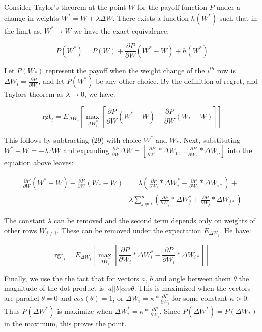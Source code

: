 \documentclass{article}
\begin{document}
Consider Taylor's theorem at the point $W$ for the payoff function $P$ under a change in weights $W^* = W + \lambda \Delta W$. There exists a function $h(W^*)$ such that in the limit as, $W^* \rightarrow W$ we have the exact equivalence:
\smallskip

\begin{equation}
P(W^*) = P(W) + \frac{\partial P}{\partial W} (W^* - W) + h(W^*) 
\end{equation}

Let $P(W_*)$ represent the payoff when the weight change of the $i^{th}$ row is $\Delta W_i = \frac{\partial P}{\partial W_i}$, and let $P(W^*)$ be any other choice. By the definition of regret, and Taylors theorem as $\lambda \rightarrow 0$, we have:
\smallskip

\begin{equation}
\textrm{rgt}_i = E_{\Delta W_j} [ \max_{\Delta W_i^*} [\frac{\partial P}{\partial W} (W^* - W) - \frac{\partial P}{\partial W} (W_* - W)] ]
\end{equation}

This follows by subtracting (29) with choice $W^*$ and $W_*$. Next, substituting $W^* - W = -\lambda \Delta W$ and expanding  $\frac{\partial P}{\partial W} \Delta W = [\frac{\partial P}{\partial W_0} * \Delta W_0, ... \frac{\partial P}{\partial W_n} * \Delta W_n]$ into the equation above leaves:
\smallskip

\begin{equation}
\begin{split}
\frac{\partial P}{\partial W} (W^* - W) - \frac{\partial P}{\partial W} (W_* - W) &= \lambda (\frac{\partial P}{\partial W_i} * \Delta W_i^* - \frac{\partial P}{\partial W_i} * \Delta W_{i*}) + \\ & \lambda \sum_{j \neq i}^{n} (\frac{\partial P}{\partial W_j} * \Delta W_j^* + \frac{\partial P}{\partial W_j} * \Delta W_{j*})
\end{split}
\end{equation}

The constant $\lambda$ can be removed and the second term depends only on weights of other rows $W_{j \neq i}$. These can be removed under the expectation $E_{\Delta W_j}$. He have:
\smallskip

\begin{equation}
\textrm{rgt}_i = E_{\Delta W_j} [ \max_{\Delta W_i^*} [\frac{\partial P}{\partial W_i} * \Delta W_i^* - \frac{\partial P}{\partial W_i} * \Delta W_{i*}] ]
\end{equation}

Finally, we use the the fact that for vectors $a$, $b$ and angle between them $\theta$ the magnitude of the dot product is $|a||b|cos \theta$. This is maximized when the vectors are parallel $\theta = 0$ and $cos(\theta) = 1$, or $\Delta W_i = \kappa* \frac{\partial P}{\partial W_i}$ for some constant $\kappa > 0$. Thus $P(\Delta W^*)$ is maximize when $\Delta W_i^* = \kappa * \frac{\partial P}{\partial W_i}$. Since $P(\Delta W^*) = P(\Delta W_*)$ in the maximum, this proves the point.
\smallskip
\end{document}
